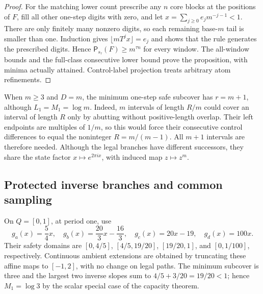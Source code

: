 \documentclass[11pt,reqno]{amsart}
\numberwithin{equation}{section}
\theoremstyle{definition}
\theoremstyle{definition}
\newcommand{\Patt}{\mathsf P}
\begin{document}
\begin{proof}
For the matching lower count prescribe any $n$ core blocks at the
positions of $F$, fill all other one-step digits with zero, and let
$x=\sum_{j\ge0}e_jm^{-j-1}<1$. There are only finitely many
nonzero digits, so each remaining base-$m$ tail is smaller than one.
Induction gives $\lfloor mT^jx\rfloor=e_j$ and shows that the
rule generates the prescribed digits. Hence $\Patt_{s_\tau}(F)\ge m^{\tau n}$ for every
window. The all-window bounds and the full-class consecutive lower
bound prove the proposition, with minima actually attained.
Control-label projection treats arbitrary atom refinements.
\end{proof}

When $m\ge3$ and $D=m$, the minimum one-step safe subcover has
$r=m+1$, although $L_1=M_1=\log m$. Indeed, $m$ intervals of
length $R/m$ could cover an interval of length $R$ only by abutting
without positive-length overlap. Their left endpoints are multiples
of $1/m$, so this would force their consecutive control differences
to equal the noninteger $R=m/(m-1)$. All $m+1$ intervals are
therefore needed. Although the legal branches have different
successors, they share the state factor $x\mapsto e^{2\pi ix}$,
with induced map $z\mapsto z^m$.

\subsection{Protected inverse branches and common sampling}
On $Q=[0,1]$, at period one, use
\[
 g_a(x)=\frac54x,\quad g_b(x)=\frac{20}3x-\frac{16}3,
 \quad g_c(x)=20x-19,\quad g_d(x)=100x.
\]
Their safety domains are
$[0,4/5]$, $[4/5,19/20]$, $[19/20,1]$, and
$[0,1/100]$, respectively. Continuous ambient extensions are
obtained by truncating these affine maps to $[-1,2]$, with no
change on legal paths. The minimum subcover is three and the largest
two inverse slopes sum to $4/5+3/20=19/20<1$; hence
$M_1=\log3$ by the scalar special case of the capacity theorem.
\end{document}
